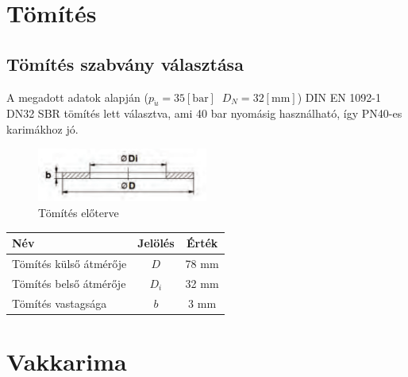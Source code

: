 \documentclass[10pt, a4paper]{article}
\newcommand{\baar}{\mathrm{\left[bar\right]}}
\newcommand{\mm}{\mathrm{\left[mm\right]}}
\begin{document}
	\section{Tömítés}
	\subsection{Tömítés szabvány választása}
	A megadott adatok alapján ($p_{\ddot{u}} = 35\baar\;\;D_N = 32\mm$) DIN EN 1092-1 DN32 SBR tömítés lett választva, ami 40 bar nyomásig használható, így PN40-es karimákhoz jó.
	\begin{figure}[h]
		\centering
		\includegraphics[width=0.5\textwidth]{ tomites_eloterv.png }
		\caption{Tömítés előterve}
		\label{fig:tomites}
	\end{figure}
	\renewcommand{\arraystretch}{1.4}
	\begin{table}[h]
		\centering
		\begin{tabular}{l|c|c}
			\textbf{Név}                              & \textbf{Jelölés} & \textbf{Érték} \\ \hline
			Tömítés külső átmérője                     & $D$                & 78 mm           \\
			Tömítés belső átmérője                     & $D_i$                & 32 mm			\\
			Tömítés vastagsága                         & $b$                & 3 mm             
		\end{tabular}
	\end{table}
	\renewcommand{\arraystretch}{1}
	\newpage
	\section{Vakkarima}
\end{document}
